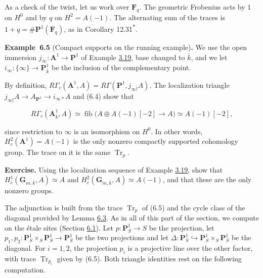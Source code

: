 \documentclass[11pt]{article}
\newenvironment{bpstatement}[2]{\par\addvspace{0.6\baselineskip}\noindent\textbf{#1}#2\textbf{.}\enspace\ignorespaces}
  {\par\addvspace{0.4\baselineskip}}
\newcommand{\bpout}[1]{#1\textsuperscript{\hyperlink{bp-outside}{\ensuremath{\ast}}}}
\providecommand{\fib}{}\renewcommand{\fib}{\operatorname{fib}}
\begin{document}
As a check of the twist, let us work over \(\mathbf F_q\). The geometric Frobenius acts by \(1\) on \(H^0\) and by \(q\) on \(H^2=A(-1)\). The alternating sum of the traces is \(1+q=\#\mathbf P^1(\mathbf F_q)\), as in Corollary \bpout{12.31}.

\label{bp529}%
\begin{bpstatement}{Example~6.5}{ (Compact supports on the running example)}
We use the open immersion \(j_\infty:\mathbf A^1\to\mathbf P^1\) of Example \hyperref[bp251]{3.19}, base changed to \(\bar k\), and we let \(i_\infty:\{\infty\}\to\mathbf P^1_{\bar k}\) be the inclusion of the complementary point.

By definition, \(R\Gamma_c(\mathbf A^1,A)=R\Gamma(\mathbf P^1,j_{\infty!}A)\). The localization triangle \(j_{\infty!}A\to A_{\mathbf P^1}\to i_{\infty*}A\) and (6.4) show that

\[
R\Gamma_c(\mathbf A^1_{\bar k},A)
\simeq\fib\bigl(A\oplus A(-1)[-2]\to A\bigr)
\simeq A(-1)[-2],
\]

since restriction to \(\infty\) is an isomorphism on \(H^0\). In other words, \(H^2_c(\mathbf A^1)=A(-1)\) is the only nonzero compactly supported cohomology group. The trace on it is the same \(\operatorname{Tr}_p\).
\end{bpstatement}

\label{bp530}%
\textbf{Exercise.} Using the localization sequence of Example \hyperref[bp251]{3.19}, show that \(H^1_c(\mathbf G_{m,\bar k},A)\simeq A\) and \(H^2_c(\mathbf G_{m,\bar k},A)\simeq A(-1)\), and that these are the only nonzero groups.

The adjunction is built from the trace \(\operatorname{Tr}_p\) of (6.5) and the cycle class of the diagonal provided by Lemma \hyperref[bp523]{6.3}. As in all of this part of the section, we compute on the étale sites (Section \hyperref[bp515]{6.1}). Let \(p:\mathbf P^1_S\to S\) be the projection, let \(p_1,p_2:\mathbf P^1_S\times_S\mathbf P^1_S\to\mathbf P^1_S\) be the two projections and let \(\Delta:\mathbf P^1_S\hookrightarrow\mathbf P^1_S\times_S\mathbf P^1_S\) be the diagonal. For \(i=1,2\), the projection \(p_i\) is a projective line over the other factor, with trace \(\operatorname{Tr}_{p_i}\) given by (6.5). Both triangle identities rest on the following computation.
\end{document}
